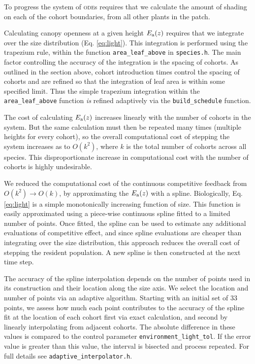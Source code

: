 \documentclass[10pt,twoside]{article}
\begin{document}
To progress the system of \textsc{ode}s requires that we calculate the amount of
shading on each of the cohort boundaries, from all other plants in the
patch.

Calculating canopy openness at a given height \(E_{\rm a}(z)\) requires that
we integrate over the size distribution (Eq. \ref{eq:light}). This
integration is performed using the trapezium rule, within the function
\texttt{area\_leaf\_above} in \texttt{species.h}. The main factor
controlling the accuracy of the integration is the spacing of cohorts.
As outlined in the section above, cohort introduction times control the
spacing of cohorts and are refined so that the integration of leaf area
is within some specified limit. Thus the simple trapezium integration
within the \texttt{area\_leaf\_above} function \emph{is} refined
adaptively via the \texttt{build\_schedule} function.

The cost of calculating \(E_{\rm a}(z)\) increases linearly with the number of
cohorts in the system. But the same calculation must then be repeated
many times (multiple heights for every cohort), so the overall computational cost
of stepping the system increases as to \(O(k^2)\), where \(k\) is the
total number of cohorts across all species. This disproportionate
increase in computational cost with the number of cohorts is highly undesirable.

We reduced the computational cost of the continuous competitive feedback
from \(O(k^2) \rightarrow O(k)\), by approximating the \(E_{\rm a}(z)\) with a
spline. Biologically, Eq. \ref{eq:light} is a simple monotonically
increasing function of size. This function is easily
approximated using a piece-wise continuous spline fitted to a limited
number of points. Once fitted, the spline can be used to estimate any
additional evaluations of competitive effect, and since spline
evaluations are cheaper than integrating over the size distribution,
this approach reduces the overall cost of stepping the resident
population. A new spline is then constructed at the next time step.

The accuracy of the spline interpolation depends on the number of points
used in its construction and their location along the size axis. We
select the location and number of points via an adaptive algorithm.
Starting with an initial set of 33 points, we assess how much each point
contributes to the accuracy of the spline fit at the location of each
cohort first via exact calculation, and second by linearly interpolating
from adjacent cohorts. The absolute difference in these values is
compared to the control parameter \texttt{environment\_light\_tol}. If
the error value is greater than this value, the interval is bisected and
process repeated. For full details see
\texttt{adaptive\_interpolator.h}.
\end{document}
